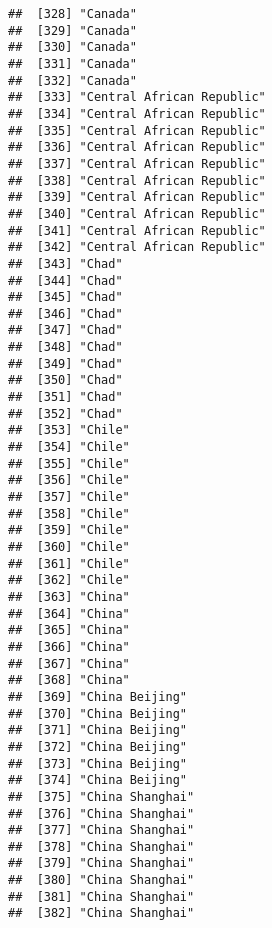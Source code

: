 \documentclass[]{article}
\begin{document}
\begin{verbatim}
##  [328] "Canada"                             
##  [329] "Canada"                             
##  [330] "Canada"                             
##  [331] "Canada"                             
##  [332] "Canada"                             
##  [333] "Central African Republic"           
##  [334] "Central African Republic"           
##  [335] "Central African Republic"           
##  [336] "Central African Republic"           
##  [337] "Central African Republic"           
##  [338] "Central African Republic"           
##  [339] "Central African Republic"           
##  [340] "Central African Republic"           
##  [341] "Central African Republic"           
##  [342] "Central African Republic"           
##  [343] "Chad"                               
##  [344] "Chad"                               
##  [345] "Chad"                               
##  [346] "Chad"                               
##  [347] "Chad"                               
##  [348] "Chad"                               
##  [349] "Chad"                               
##  [350] "Chad"                               
##  [351] "Chad"                               
##  [352] "Chad"                               
##  [353] "Chile"                              
##  [354] "Chile"                              
##  [355] "Chile"                              
##  [356] "Chile"                              
##  [357] "Chile"                              
##  [358] "Chile"                              
##  [359] "Chile"                              
##  [360] "Chile"                              
##  [361] "Chile"                              
##  [362] "Chile"                              
##  [363] "China"                              
##  [364] "China"                              
##  [365] "China"                              
##  [366] "China"                              
##  [367] "China"                              
##  [368] "China"                              
##  [369] "China Beijing"                      
##  [370] "China Beijing"                      
##  [371] "China Beijing"                      
##  [372] "China Beijing"                      
##  [373] "China Beijing"                      
##  [374] "China Beijing"                      
##  [375] "China Shanghai"                     
##  [376] "China Shanghai"                     
##  [377] "China Shanghai"                     
##  [378] "China Shanghai"                     
##  [379] "China Shanghai"                     
##  [380] "China Shanghai"                     
##  [381] "China Shanghai"                     
##  [382] "China Shanghai"                     

\end{verbatim}
\end{document}
